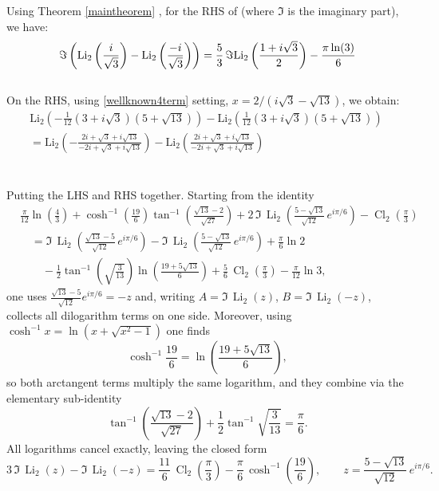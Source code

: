 \documentclass[12pt]{article}
\newcommand{\Li}{\operatorname{Li}}
\newcommand{\Cl}{\operatorname{Cl}}
\begin{document}
\noindent Using Theorem \ref{maintheorem} , for the RHS of  (where $\Im$ is the imaginary part), we have:
\begin{equation}
\\\Im \left(\text{Li}_2\left(\frac{i}{\sqrt{3}}\right) - \text{Li}_2\left(\frac{-i}{\sqrt{3}}\right)\right)=   \frac{5}{3} \, \Im\text{Li}_2\left(\frac{1 + i\sqrt{3}}{2}\right) - \frac{\pi \ln(3)}{6}  
\end{equation}
\\
On the RHS, using \eqref{wellknown4term} setting, $ x=2/(i \sqrt{3}-\sqrt{13})$, we obtain:
\begin{equation}
\begin{aligned}
\text{Li}_2\left(-\frac{1}{12} \left(3 + i\sqrt{3}\right)\left(5 + \sqrt{13}\right)\right) - \text{Li}_2\left(\frac{1}{12}\left(3 + i\sqrt{3}\right)\left(5 + \sqrt{13}\right)\right)
\ \\
= \text{Li}_2\left(-\frac{2i + \sqrt{3} + i\sqrt{13}}{-2i + \sqrt{3} + i\sqrt{13}}\right) - \text{Li}_2\left(\frac{2i + \sqrt{3} + i\sqrt{13}}{-2i + \sqrt{3} + i\sqrt{13}}\right)
\end{aligned}
\end{equation}
\\
\\
Putting the LHS and RHS together. Starting from the identity
\begin{align*}
&\frac{\pi}{12}\ln\!\left(\frac{4}{3}\right)
+\cosh^{-1}\!\left(\frac{19}{6}\right)\tan^{-1}\!\left(\frac{\sqrt{13}-2}{\sqrt{27}}\right)
+2\,\Im\,\Li_2\!\left(\frac{5-\sqrt{13}}{\sqrt{12}}\,e^{i\pi/6}\right)
-\Cl_2\!\left(\frac{\pi}{3}\right) \\[4pt]
&\quad=\Im\,\Li_2\!\left(\frac{\sqrt{13}-5}{\sqrt{12}}\,e^{i\pi/6}\right)
-\Im\,\Li_2\!\left(\frac{5-\sqrt{13}}{\sqrt{12}}\,e^{i\pi/6}\right)
+\frac{\pi}{6}\ln 2 \\[4pt]
&\qquad-\frac12\tan^{-1}\!\left(\sqrt{\frac{3}{13}}\right)
\ln\!\left(\frac{19+5\sqrt{13}}{6}\right)
+\frac56\,\Cl_2\!\left(\frac{\pi}{3}\right)
-\frac{\pi}{12}\ln 3,
\end{align*}
one uses $\frac{\sqrt{13}-5}{\sqrt{12}}e^{i\pi/6}=-z$ and, writing $A=\Im\,\Li_2(z)$, $B=\Im\,\Li_2(-z)$, collects all dilogarithm terms on one side.  Moreover, using $\cosh^{-1}x=\ln\!\left(x+\sqrt{x^2-1}\right)$ one finds
\[
\cosh^{-1}\!\frac{19}{6}=\ln\!\left(\frac{19+5\sqrt{13}}{6}\right),
\]
so both arctangent terms multiply the same logarithm, and they combine via the elementary sub-identity
\[
\tan^{-1}\!\left(\frac{\sqrt{13}-2}{\sqrt{27}}\right)+\frac12\tan^{-1}\!\sqrt{\frac{3}{13}}=\frac{\pi}{6}.
\]
All logarithms cancel exactly, leaving the closed form
\begin{equation}
\label{eq:dilog-duplication}
3\,\Im\,\Li_2(z)-\Im\,\Li_2(-z)=\frac{11}{6}\,\Cl_2\!\left(\frac{\pi}{3}\right)-\frac{\pi}{6}\,\cosh^{-1}\!\left(\frac{19}{6}\right),
\qquad z=\frac{5-\sqrt{13}}{\sqrt{12}}\,e^{i\pi/6}.
\end{equation}
 
\end{document}
